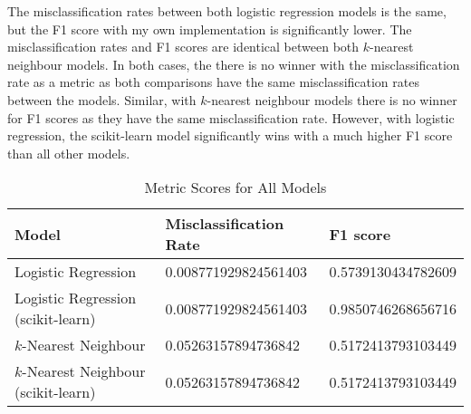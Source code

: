 \documentclass[12pt]{article}
\begin{document}
The misclassification rates between both logistic regression models is the same, but the F1 score with my own implementation is significantly lower. The misclassification rates and F1 scores are identical between both $k$-nearest neighbour models. In both cases, the there is no winner with the misclassification rate as a metric as both comparisons have the same misclassification rates between the models. Similar, with $k$-nearest neighbour models there is no winner for F1 scores as they have the same misclassification rate. However, with logistic regression, the scikit-learn model significantly wins with a much higher F1 score than all other models.

\begin{table}[htp]
\centering
\caption{Metric Scores for All Models}\label{tab:err}
\begin{tabular}{|l|l|l|}
	\hline
	Model	& Misclassification Rate	& F1 score \\ \hline\hline
	Logistic Regression						& 0.008771929824561403	& 0.5739130434782609		\\ \hline
	Logistic Regression (scikit-learn)		& 0.008771929824561403	& 0.9850746268656716	\\ \hline
	$k$-Nearest Neighbour					& 0.05263157894736842	& 0.5172413793103449	\\ \hline
	$k$-Nearest Neighbour (scikit-learn)	& 0.05263157894736842	& 0.5172413793103449	\\ \hline
\end{tabular}
\end{table}

% 
\end{document}
